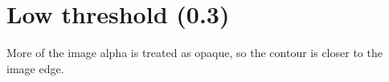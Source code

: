 \documentclass{article}
\begin{document}
\section*{Low threshold (0.3)}

More of the image alpha is treated as opaque,
so the contour is closer to the image edge.

\lipsum[1-8]
\end{document}
